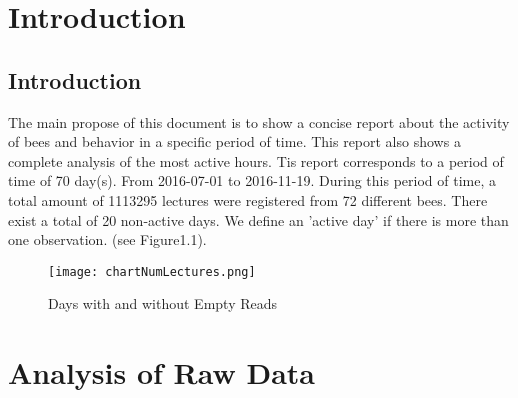 \documentclass[11pt,fleqn]{book} %
\begin{document}


\pagestyle{empty} %

\tableofcontents %


\pagestyle{fancy} %


\chapter{Introduction}

\normalsize%
\section*{Introduction}%
The main propose of this document  is to show a concise report about the activity of bees and behavior in a specific period of time. This report also shows a complete analysis of the most active hours.\newline%
\newline%
Tis report corresponds to a period of time of 70 day(s). From 2016{-}07{-}01 to 2016{-}11{-}19. During this period of time, a total amount of 1113295 lectures were registered from 72 different bees. There exist a total of 20 non{-}active days. We define an 'active day' if there is more than one observation. (see Figure1.1).\newline%
\newline%
%


\begin{figure}[h!]%
\centering%
\texttt{[image: chartNumLectures.png]}%
\caption{Days with and without Empty Reads}%
\end{figure}


\chapter{Analysis of Raw Data}
\normalsize%
\end{document}
